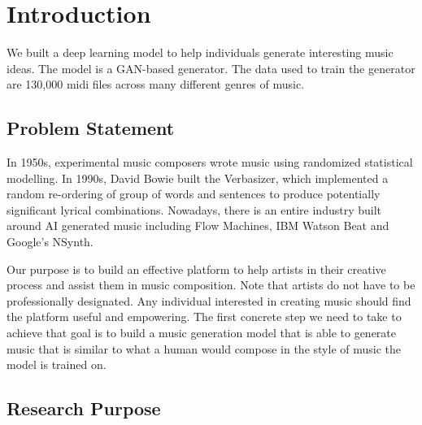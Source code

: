 \documentclass[12pt,oneside]{chicagocapstone}
\begin{document}
  \hypersetup{linkcolor=black}
  \setcounter{tocdepth}{2}
  \tableofcontents

  \listoffigures

  \listoftables


\mainmatter %
\pagestyle{fancyplain} %

\hypertarget{introduction}{%
\chapter*{Introduction}\label{introduction}}

We built a deep learning model to help individuals generate interesting music ideas. The model is a GAN-based generator. The data used to train the generator are 130,000 midi files across many different genres of music.

\hypertarget{problem-statement}{%
\section*{Problem Statement}\label{problem-statement}}

In 1950s, experimental music composers wrote music using randomized statistical modelling. In 1990s, David Bowie built the Verbasizer, which implemented a random re-ordering of group of words and sentences to produce potentially significant lyrical combinations. Nowadays, there is an entire industry built around AI generated music including Flow Machines, IBM Watson Beat and Google's NSynth.

Our purpose is to build an effective platform to help artists in their creative process and assist them in music composition. Note that artists do not have to be professionally designated. Any individual interested in creating music should find the platform useful and empowering. The first concrete step we need to take to achieve that goal is to build a music generation model that is able to generate music that is similar to what a human would compose in the style of music the model is trained on.

\hypertarget{research-purpose}{%
\section*{Research Purpose}\label{research-purpose}}
\end{document}
